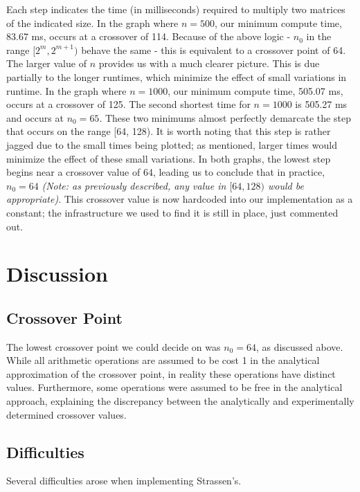 \documentclass[solution, letterpaper]{cs121}
\begin{document}
Each step indicates the time (in milliseconds) required to multiply two matrices of the indicated size. In the graph where $n=500$, our minimum compute time, 83.67 ms, occurs at a crossover of 114. Because of the above logic - $n_0$ in the range $[2^m,2^{m+1})$ behave the same - this is equivalent to a crossover point of 64. The larger value of $n$ provides us with a much clearer picture. This is due partially to the longer runtimes, which minimize the effect of small variations in runtime. In the graph where $n=1000$, our minimum compute time, 505.07 ms, occurs at a crossover of 125. The second shortest time for $n = 1000$ is 505.27 ms and occurs at $n_0 = 65$. These two minimums almost perfectly demarcate the step that occurs on the range [64, 128). It is worth noting that this step is rather jagged due to the small times being plotted; as mentioned, larger times would minimize the effect of these small variations. In both graphs, the lowest step begins near a crossover value of 64, leading us to conclude that in practice, $n_0 = 64$ \textit{(Note: as previously described, any value in $[64,128)$ would be appropriate)}. This crossover value is now hardcoded into our implementation as a constant; the infrastructure we used to find it is still in place, just commented out.

\section*{Discussion}

\subsection*{Crossover Point}
\hspace{4mm} The lowest crossover point we could decide on was $n_0 = 64$, as discussed above. While all arithmetic operations are assumed to be cost 1 in the analytical approximation of the crossover point, in reality these operations have distinct values. Furthermore, some operations were assumed to be free in the analytical approach, explaining the discrepancy between the analytically and experimentally determined crossover values.

\subsection*{Difficulties}
\hspace{4mm} Several difficulties arose when implementing Strassen's.
\end{document}
